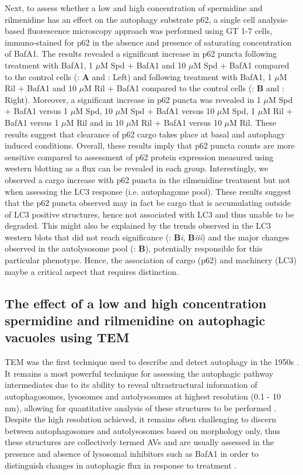 {Next, to assess whether a low and high concentration of spermidine and rilmenidine has an effect on the autophagy substrate p62, a single cell analysis-based fluorescence microscopy approach was performed using GT 1-7 cells, immuno-stained for p62 in the absence and presence of saturating concentration of BafA1. The results revealed a significant increase in p62 puncta following treatment with BafA1, 1 $\mu$M Spd + BafA1 and 10 $\mu$M Spd + BafA1 compared to the control cells (: \textbf{A} and : Left) and following treatment  with BafA1, 1 $\mu$M Ril + BafA1  and 10 $\mu$M Ril + BafA1 compared to the control cells (: \textbf{B} and : Right). Moreover, a significant increase in p62 puncta was revealed in 1 $\mu$M Spd + BafA1 versus 1 $\mu$M Spd, 10 $\mu$M Spd + BafA1 versus 10 $\mu$M Spd, 1 $\mu$M Ril + BafA1 versus 1 $\mu$M Ril and in 10 $\mu$M Ril + BafA1 versus 10 $\mu$M Ril. These results suggest that clearance of p62 cargo takes place at basal and autophagy induced conditions. Overall, these results imply that p62 puncta counts are more sensitive compared to assessment of p62 protein expression measured using western blotting as a flux can be revealed in each group. Interestingly, we observed a cargo increase with p62 puncta in the rilmenidine treatment but not when assessing the LC3 response (i.e. autophagome pool). These results suggest that the p62 puncta observed may in fact be cargo that is accumulating outside of LC3 positive structures, hence not associated with LC3 and thus unable to be degraded. This might also be explained by the trends observed in the LC3 western blots that did not reach significance  (: \textbf{B}\textit{i}, \textbf{B}\textit{iii}) and the major changes observed in the autolysosome pool (: \textbf{B}), potentially responsible for this particular phenotype. Hence, the association of cargo (p62) and machinery (LC3) maybe a critical aspect that requires distinction.
  
\subsection{The effect of a low and high concentration spermidine and rilmenidine on autophagic vacuoles using TEM}

TEM was the first technique used to describe and detect autophagy in the 1950s \citep{Deter1967}. It remains a most powerful technique for assessing the autophagic pathway intermediates due to its ability to reveal ultrastructural information of autophagosomes, lysosomes and autolysosomes at highest resolution (0.1 - 10 nm), allowing for quantitative analysis of these structures to be performed \citep{klionsky2016}. Despite the high resolution achieved, it remains often challenging to discern between autophagosomes and autolysosomes based on morphology only, thus these structures are collectively termed AVs \citep{Eskelinen2008,klionsky2016} and are usually assessed in the presence and absence of lysosomal inhibitors such as BafA1 in order to distinguish changes in autophagic flux in response to treatment \citep{Eskelinen2011,klionsky2016}.

}
